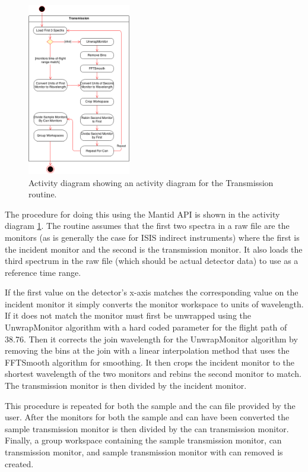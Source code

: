 \documentclass[paper=a4, fontsize=11pt]{scrartcl}	%
\numberwithin{equation}{section}															%
\numberwithin{figure}{section}																%
\numberwithin{table}{section}																%
\begin{document}
\begin{figure}[H]
\centering
\includegraphics[width=0.4\textwidth]{img/uml/activity_diagrams/Transmission_activity.png}
\caption{Activity diagram showing an activity diagram for the Transmission routine.}
\label{fig:c2e-transmission-activity-diagram}
\end{figure}

The procedure for doing this using the Mantid API is shown in the activity diagram \ref{fig:c2e-transmission-activity-diagram}. The routine assumes that the first two spectra in a raw file are the monitors (as is generally the case for ISIS indirect instruments) where the first is the incident monitor and the second is the transmission monitor. It also loads the third spectrum in the raw file (which should be actual detector data) to use as a reference time range. 

If the first value on the detector's x-axis matches the corresponding value on the incident monitor it simply converts the monitor workspace to units of wavelength. If it does not match the monitor must first be unwrapped using the UnwrapMonitor algorithm with a hard coded parameter for the flight path of 38.76. Then it corrects the join wavelength for the UnwrapMonitor algorithm by removing the bins at the join with a linear interpolation method that uses the FFTSmooth algorithm for smoothing. It then crops the incident monitor to the shortest wavelength of the two monitors and rebins the second monitor to match. The transmission monitor is then divided by the incident monitor.

This procedure is repeated for both the sample and the can file provided by the user. After the monitors for both the sample and can have been converted the sample transmission monitor is then divided by the can transmission monitor. Finally, a group workspace containing the sample transmission monitor, can transmission monitor, and sample transmission monitor with can removed is created.
\end{document}
